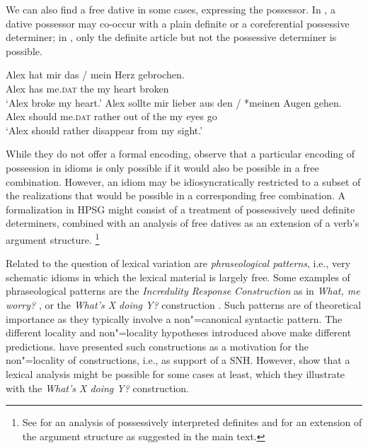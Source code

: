 \documentclass[output=paper,biblatex,babelshorthands,newtxmath,draftmode,colorlinks,citecolor=brown]{langscibook}
\begin{document}
We can also find a free dative in some cases, expressing the possessor.  In , a
dative possessor may co-occur with a plain definite or a coreferential possessive determiner; in
, only the definite article but not the possessive determiner is possible.


\eal
\label{ex-herz-augen}
\ex 
\gll Alex hat mir das / mein Herz gebrochen.\\
Alex has me.\textsc{dat} the {} my heart broken\\
\glt `Alex broke my heart.'\label{ex-herz}
\ex 
\gll Alex sollte mir lieber aus den / *meinen Augen gehen.\\
Alex should me.\textsc{dat} rather {out of} the {} \hphantom{*}my eyes go\\
\glt `Alex should rather disappear from my sight.'\label{ex-augen}
\zl 

\noindent
While they do not offer a formal encoding, \citet{Markantonatou:Sailer:16} observe that a particular
encoding of possession in idioms is only possible if it would also be possible in a free
combination. However, an idiom may be idiosyncratically restricted to a subset of the realizations
that would be possible in a corresponding free combination. A formalization in HPSG might consist of
a treatment of possessively used definite determiners, combined with an analysis of free datives as
an extension of a verb's argument structure.%
\footnote{See  for an analysis of possessively interpreted definites and
   for an extension of the argument structure as suggested in the main
  text.
}

Related to the question of lexical variation are \emph{phraseological
  patterns}, i.e., very schematic idioms in which the lexical material is largely free. Some
examples of phraseological patterns are the \emph{Incredulity Response Construction} as in
\emph{What, me worry?} \citep{Akmajian:84,Lambrecht:90}, or the \emph{What's X doing Y?}
construction \citep{KF99a}.  Such patterns are of theoretical importance as they typically involve a
non"=canonical syntactic pattern.  The different locality and non"=locality hypotheses introduced
above make different predictions.  \citet{FKoC88a} have presented such constructions as a motivation
for the non"=locality of constructions, i.e., as support of a SNH. However, \citet{KF99a} show that
a lexical analysis might be possible for some cases at least, which they illustrate with the
\emph{What's X doing Y?} construction.
\end{document}
